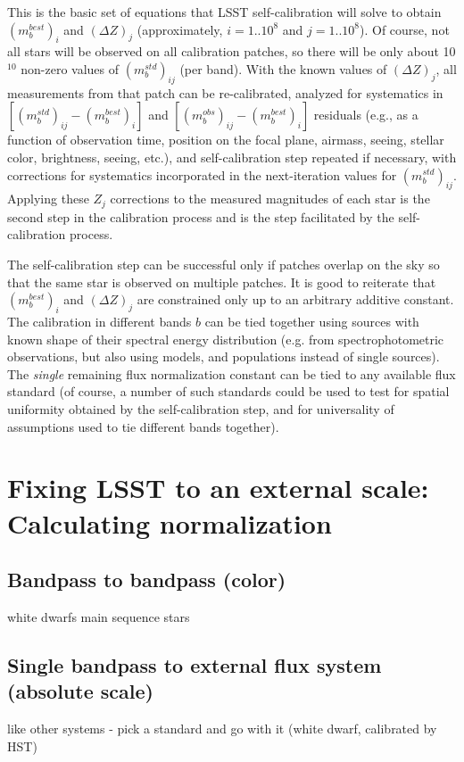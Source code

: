 \documentclass[12pt,preprint]{aastex}
\begin{document}
This is the basic set of equations that LSST self-calibration 
will solve to obtain $(m_b^{best})_{i}$ and $(\Delta Z)_j$
(approximately, $i=1..10^8$ and $j=1..10^8$). Of course, not 
all stars will be observed on all calibration patches, so there 
will be only about 10$^{10}$ non-zero values of $(m_b^{std})_{ij}$
(per band). 
With the known values of $(\Delta Z)_j$, all measurements from that 
patch can be re-calibrated, analyzed for systematics in 
$[(m_b^{std})_{ij} - (m_b^{best})_{i}]$ and $[(m_b^{obs})_{ij} - (m_b^{best})_{i}]$ 
residuals (e.g., as a function
of observation time, position on the focal plane, airmass, seeing,
stellar color, brightness, seeing, etc.), and self-calibration
step repeated if necessary, with corrections for systematics incorporated 
in the next-iteration values for $(m_b^{std})_{ij}$. 
Applying these $Z_j$ corrections to the measured
magnitudes of each star is the second step in 
the calibration process and is the step facilitated by the self-calibration process. 

The self-calibration step can be successful only if patches
overlap on the sky so that the same star is observed on 
multiple patches. It is good to reiterate that $(m_b^{best})_{i}$ and 
$(\Delta Z)_j$ are constrained only up to an arbitrary 
additive constant. The calibration in different bands $b$
can be tied together using sources with known shape of their 
spectral energy distribution (e.g. from spectrophotometric
observations, but also using models, and populations instead
of single sources). The {\it single} remaining flux normalization
constant can be tied to any available flux standard (of course,
a number of such standards could be used to test for spatial
uniformity obtained by the self-calibration step, and for 
universality of assumptions used to tie different bands together).


\section{Fixing LSST to an external scale: Calculating normalization}
\subsection{Bandpass to bandpass (color)}
white dwarfs
main sequence stars
\subsection{Single bandpass to external flux system (absolute scale)}
like other systems - pick a standard and go with it (white dwarf,
calibrated by HST)
\end{document}
